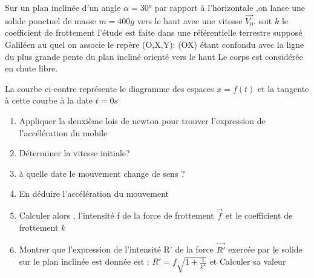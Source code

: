 \documentclass[10pt,a4paper]{article}
\begin{document}
\begin{tcolorbox}[sabour,title=EXERCICE 19]
Sur un plan inclinée d'un angle $\alpha= $30°  par rapport à l'horizontale ,on lance une solide ponctuel de masse $m=400g$  vers le haut avec une vitesse  $ \vec{V_0}$. soit $k$ le coefficient de frottement  
l'étude est faite dans une référentielle terrestre supposé Galiléen au quel on associe le repère (O,X,Y): (OX) étant confondu avec la ligne du plus grande pente du plan incliné orienté vers le haut  
Le corps est considérée  en chute libre.

 La courbe ci-contre représente le diagramme des espaces $x=f(t)$ et la tangente à cette courbe à la date $t=0s$

\begin{enumerate}
\item Appliquer la deuxième lois de newton pour  trouver l'expression de l'accélération du mobile 
\item Déterminer la vitesse initiale? 
\item à quelle date le mouvement change de sens ?
\item En déduire l'accélération  du mouvement 
\item Calculer alors , l'intensité f de la force de frottement $\vec{f}$ et  le coefficient de frottement  $k$
\item Montrer que l'expression de l'intensité R' de la force $\vec{R'}$ exercée par le solide sur le plan inclinée est donnée est : $R'=f\sqrt{1+\frac{1}{k^2}}$ et Calculer sa valeur 
\end{enumerate}

\end{tcolorbox}
\end{document}
